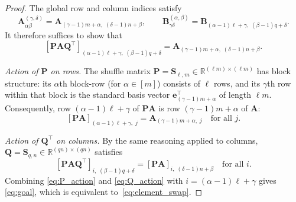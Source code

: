 \documentclass[10pt,a4paper]{amsart}
\newcommand{\RR}[2]{\mathbb{R}^{#1 \times #2}}
\def\bA{\mathbf{A}}
\def\bB{\mathbf{B}}
\def\bP{\mathbf{P}}
\def\bQ{\mathbf{Q}}
\def\bS{\mathbf{S}}
\def\be{\mathbf{e}}
\begin{document}
\begin{proof}
The global row and column indices satisfy
\begin{equation}
\label{eq:index_translation}
    \bA^{(\gamma,\delta)}_{\alpha\beta} = \bA_{(\gamma-1)m+\alpha,\;(\delta-1)n+\beta},
    \qquad
    \bB^{(\alpha,\beta)}_{\gamma\delta} = \bB_{(\alpha-1)\ell+\gamma,\;(\beta-1)q+\delta}.
\end{equation}
It therefore suffices to show that
\begin{equation}
\label{eq:goal}
    [\bP\bA\bQ^\top]_{(\alpha-1)\ell+\gamma,\;(\beta-1)q+\delta}
    = \bA_{(\gamma-1)m+\alpha,\;(\delta-1)n+\beta}.
\end{equation}

\medskip\noindent\textit{Action of $\bP$ on rows.}
The shuffle matrix $\bP = \bS_{\ell,m}\in\RR{(\ell m)}{(\ell m)}$ has block structure: its $\alpha$th
block-row (for $\alpha\in[m]$) consists of $\ell$ rows, and its $\gamma$th row within that block
is the standard basis vector $\be_{(\gamma-1)m+\alpha}^\top$ of length $\ell m$.  Consequently,
row $(\alpha-1)\ell+\gamma$ of $\bP\bA$ is row $(\gamma-1)m+\alpha$ of $\bA$:
\begin{equation}
\label{eq:P_action}
    [\bP\bA]_{(\alpha-1)\ell+\gamma,\;j} = \bA_{(\gamma-1)m+\alpha,\;j}
    \quad\text{for all }j.
\end{equation}

\medskip\noindent\textit{Action of $\bQ^\top$ on columns.}
By the same reasoning applied to columns, $\bQ = \bS_{q,n}\in\RR{(qn)}{(qn)}$ satisfies
\begin{equation}
\label{eq:Q_action}
    [\bP\bA\bQ^\top]_{i,\;(\beta-1)q+\delta} = [\bP\bA]_{i,\;(\delta-1)n+\beta}
    \quad\text{for all }i.
\end{equation}
Combining \eqref{eq:P_action} and \eqref{eq:Q_action} with $i=(\alpha-1)\ell+\gamma$ gives
\eqref{eq:goal}, which is equivalent to~\eqref{eq:element_swap}.
\end{proof}
\end{document}
